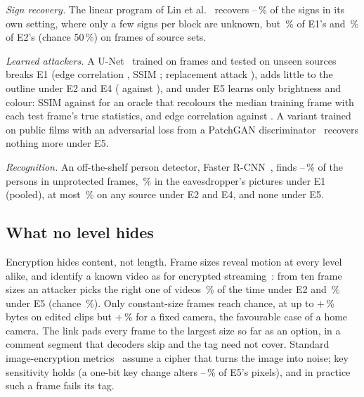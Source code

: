 \textit{Sign recovery.} The linear program of Lin et al.~\cite{lin2024} recovers \SrLinSignsMin--\SrLinSignsMax\,\% of the signs in its own setting, where only a few signs per block are unknown, but \SrEoneSigns\,\% of E1's and \SrEtwoSigns\,\% of E2's (chance 50\,\%) on \SrFrames{} frames of \SrSources{} source sets.

\textit{Learned attackers.} A U-Net~\cite{unet} trained on \LearnBigTrain{} frames and tested on unseen sources breaks E1 (edge correlation \LearnEoneEdge, SSIM \LearnEoneSsim; replacement attack \ReplEoneEdge), adds little to the outline under E2 and E4 (\LearnEtwoFourEdge{} against \ReplEtwoFourEdge), and under E5 learns only brightness and colour: SSIM \LearnEfiveSsimBig{} against \CtrlTrueSsim{} for an oracle that recolours the median training frame with each test frame's true statistics, and edge correlation \LearnEfiveEdgeBig{} against \CtrlTrueEdge. A variant trained on public films with an adversarial loss from a PatchGAN discriminator~\cite{isola2017} recovers nothing more under E5.

\textit{Recognition.} An off-the-shelf person detector, Faster R-CNN~\cite{ren2015}, finds \RecPlainMin--\RecPlainMax\,\% of the \RecPersons{} persons in unprotected frames, \RecEonePooled\,\% in the eavesdropper's pictures under E1 (pooled), at most \RecEtwoFourMax\,\% on any source under E2 and E4, and none under E5.

\subsection{What no level hides}\label{sec:sizes}
Encryption hides content, not length. Frame sizes reveal motion at every level alike, and identify a known video as for encrypted streaming~\cite{schuster2017}: from ten frame sizes an attacker picks the right one of \FpVideos{} videos \FpEtwoTen\,\% of the time under E2 and \FpEfiveTen\,\% under E5 (chance \FpChance\,\%). Only constant-size frames reach chance, at up to $+$\PadFilmMax\,\% bytes on edited clips but $+$\PadFixed\,\% for a fixed camera, the favourable case of a home camera. The link pads every frame to the largest size so far as an option, in a comment segment that decoders skip and the tag need not cover. Standard image-encryption metrics~\cite{massoudi2008} assume a cipher that turns the image into noise; key sensitivity holds (a one-bit key change alters \StdNpcrEfiveMin--\StdNpcrEfiveMax\,\% of E5's pixels), and in practice such a frame fails its tag.
